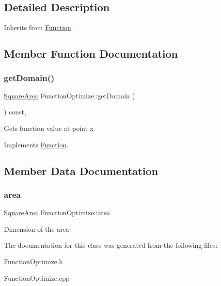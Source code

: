 \subsection{Detailed Description}
Inherits from \hyperlink{class_function}{Function}. 

\subsection{Member Function Documentation}
\mbox{\label{class_function_optimize_a5b2a52f2851494a02fbd52b1862a98ae}} 
\subsubsection{\texorpdfstring{get\+Domain()}{getDomain()}}
{\footnotesize\ttfamily \hyperlink{class_square_area}{Square\+Area} Function\+Optimize\+::get\+Domain (\begin{DoxyParamCaption}{ }\end{DoxyParamCaption}) const\hspace{0.3cm}{\ttfamily [override]}, {\ttfamily [virtual]}}

Gets function value at point x 

Implements \hyperlink{class_function_add150985034ade039806b8beb9890cdc}{Function}.



\subsection{Member Data Documentation}
\mbox{\label{class_function_optimize_ab3593f5f260c05abe0c7704b2356890c}} 
\subsubsection{\texorpdfstring{area}{area}}
{\footnotesize\ttfamily \hyperlink{class_square_area}{Square\+Area} Function\+Optimize\+::area\hspace{0.3cm}{\ttfamily [private]}}

Dimension of the area 

The documentation for this class was generated from the following files\+:\begin{DoxyCompactItemize}
\item 
Function\+Optimize.\+h\item 
Function\+Optimize.\+cpp\end{DoxyCompactItemize}
